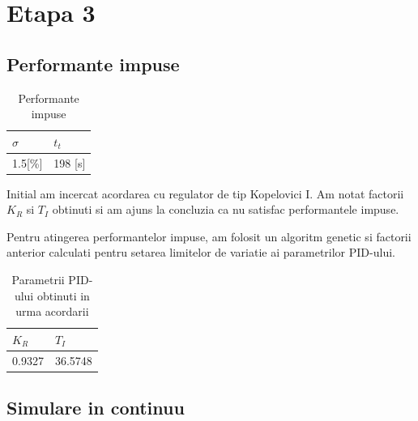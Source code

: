 \documentclass[12pt,english]{article}
\begin{document}
\section {Etapa 3}

\subsection {Performante impuse}

\begin{table}[H]
  \centering
  \begin{tabular}{|l|l|}
    \hline
    $\sigma$ & $t_t$ \\
    \hline
    1.5[\%] & 198 [s] \\
    \hline
  \end{tabular}
  \caption{Performante impuse}
\end{table}

Initial am incercat acordarea cu regulator de tip Kopelovici I. Am notat factorii $K_R$ si $T_I$ obtinuti si am ajuns la concluzia ca nu satisfac performantele impuse.

Pentru atingerea performantelor impuse, am folosit un algoritm genetic si factorii anterior calculati pentru setarea limitelor de variatie ai parametrilor PID-ului.

\begin{table}[H]
  \centering
  \begin{tabular}{|l|l|}
    \hline
    $K_R$ & $T_I$ \\
    \hline
    0.9327 & 36.5748 \\
    \hline
  \end{tabular}
  \caption{Parametrii PID-ului obtinuti in urma acordarii}
\end{table}

\subsection {Simulare in continuu}

\begin{figure}[H]
  \centering
\end{figure}
\end{document}

